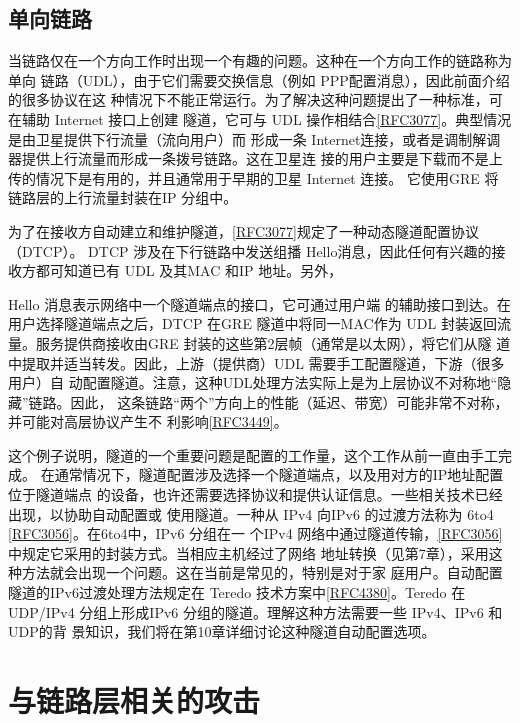 \subsection{单向链路}

当链路仅在一个方向工作时出现一个有趣的问题。这种在一个方向工作的链路称为单向
链路（UDL），由于它们需要交换信息（例如 PPP配置消息），因此前面介绍的很多协议在这
种情况下不能正常运行。为了解决这种问题提出了一种标准，可在辅助 Internet 接口上创建
隧道，它可与 UDL
操作相结合\href{https://www.rfc-editor.org/rfc/rfc3077}{[RFC3077]}。典型情况是由卫星提供下行流量（流向用户）而
形成一条 Internet连接，或者是调制解调器提供上行流量而形成一条拨号链路。这在卫星连
接的用户主要是下载而不是上传的情况下是有用的，并且通常用于早期的卫星 Internet 连接。
它使用GRE 将链路层的上行流量封装在IP 分组中。

为了在接收方自动建立和维护隧道，\href{https://www.rfc-editor.org/rfc/rfc3077}{[RFC3077]}规定了一种动态隧道配置协议（DTCP）。
DTCP 涉及在下行链路中发送组播 Hello消息，因此任何有兴趣的接收方都可知道已有 UDL
及其MAC 和IP 地址。另外，

Hello 消息表示网络中一个隧道端点的接口，它可通过用户端
的辅助接口到达。在用户选择隧道端点之后，DTCP 在GRE 隧道中将同一MAC作为 UDL
封装返回流量。服务提供商接收由GRE 封装的这些第2层帧（通常是以太网），将它们从隧
道中提取并适当转发。因此，上游（提供商）UDL 需要手工配置隧道，下游（很多用户）自
动配置隧道。注意，这种UDL处理方法实际上是为上层协议不对称地“隐藏”链路。因此，
这条链路“两个”方向上的性能（延迟、带宽）可能非常不对称，并可能对高层协议产生不
利影响\href{https://www.rfc-editor.org/rfc/rfc3449}{[RFC3449]}。

这个例子说明，隧道的一个重要问题是配置的工作量，这个工作从前一直由手工完成。
在通常情况下，隧道配置涉及选择一个隧道端点，以及用对方的IP地址配置位于隧道端点
的设备，也许还需要选择协议和提供认证信息。一些相关技术已经出现，以协助自动配置或
使用隧道。一种从 IPv4 向IPv6 的过渡方法称为 6to4
\href{https://www.rfc-editor.org/rfc/rfc3056}{[RFC3056]}。在6to4中，IPv6 分组在一
个IPv4
网络中通过隧道传输，\href{https://www.rfc-editor.org/rfc/rfc3056}{[RFC3056]}中规定它采用的封装方式。当相应主机经过了网络
地址转换（见第7章），采用这种方法就会出现一个问题。这在当前是常见的，特别是对于家
庭用户。自动配置隧道的IPv6过渡处理方法规定在 Teredo
技术方案中\href{https://www.rfc-editor.org/rfc/rfc4380}{[RFC4380]}。Teredo
在UDP/IPv4 分组上形成IPv6 分组的隧道。理解这种方法需要一些 IPv4、IPv6 和UDP的背
景知识，我们将在第10章详细讨论这种隧道自动配置选项。

\section{与链路层相关的攻击}

